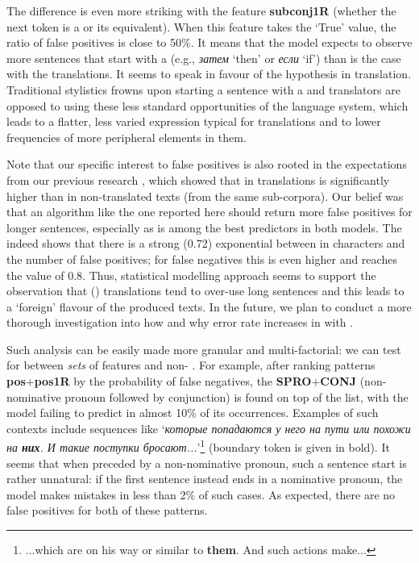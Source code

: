 \documentclass[output=paper]{langsci/langscibook.cls}
\begin{document}
The difference is even more striking with the feature \textbf{subconj1R} (whether the next token is a  or its equivalent). When this feature takes the `True' value, the ratio of false positives is close to 50\%. It means that the model expects to observe more sentences that start with a  (e.g., \textit{затем} `then' or \textit{если} `if') than is the case with the  translations. It seems to speak in favour of the  hypothesis in translation. Traditional stylistics frowns upon starting a sentence with a  and translators are opposed to using these less standard opportunities of the language system, which leads to a flatter, less varied expression typical for translations and to lower frequencies of more peripheral elements in them. 

Note that our specific interest to false positives is also rooted in the expectations from our previous research \citet{Kunilovskaya:2015}, which showed that  in translations is significantly higher than in non-translated texts (from the same sub-corpora). Our belief was that an algorithm like the one reported here should return more false positives for longer sentences, especially as  is among the best predictors in both models. The  indeed shows that there is a strong (0.72) exponential  between  in characters and the number of false positives; for false negatives this  is even higher and reaches the value of 0.8. Thus, statistical modelling approach seems to support the observation that () translations tend to over-use long sentences and this leads to a `foreign' flavour of the produced texts. In the future, we plan to conduct a more thorough investigation into how and why error rate increases in  with .

Such analysis can be easily made more granular and multi-factorial: we can test for  between \textit{sets} of features and non- . For example, after ranking patterns \textbf{pos}+\textbf{pos1R} by the probability of false negatives, the  \textbf{SPRO}+\textbf{CONJ} (non-nominative pronoun followed by conjunction) is found on top of the list, with the model failing to predict  in almost 10\% of its occurrences. Examples of such contexts include sequences like `\textit{которые попадаются у него на пути или похожи на \textbf{них}. И такие поступки бросают...}'\footnote{...which are on his way or similar to \textbf{them}. And such actions make...} (boundary token is given in bold). It seems that when preceded by a non-nominative pronoun, such a sentence start is rather unnatural: if the first sentence instead ends in a nominative pronoun, the model makes mistakes in less than 2\% of such cases. As expected, there are no false positives for both of these patterns.
\end{document}
